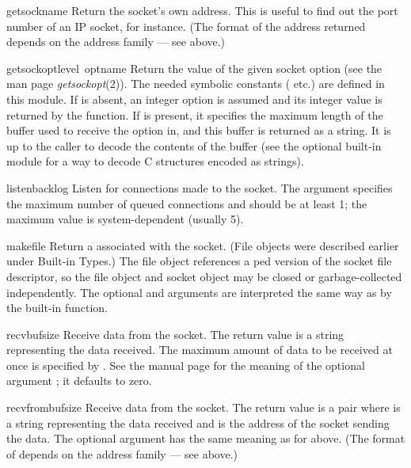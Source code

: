 \begin{funcdesc}{getsockname}{}
Return the socket's own address.  This is useful to find out the port
number of an IP socket, for instance.
(The format of the address returned depends on the address family ---
see above.)
\end{funcdesc}

\begin{funcdesc}{getsockopt}{level\, optname}
Return the value of the given socket option (see the \UNIX{} man page
\emph{getsockopt}(2)).  The needed symbolic constants ( etc.)
are defined in this module.  If 
is absent, an integer option is assumed and its integer value
is returned by the function.  If  is present, it specifies
the maximum length of the buffer used to receive the option in, and
this buffer is returned as a string.  It is up to the caller to decode
the contents of the buffer (see the optional built-in module
 for a way to decode C structures encoded as strings).
\end{funcdesc}

\begin{funcdesc}{listen}{backlog}
Listen for connections made to the socket.  The  argument
specifies the maximum number of queued connections and should be at
least 1; the maximum value is system-dependent (usually 5).
\end{funcdesc}

\begin{funcdesc}{makefile}{}
Return a  associated with the socket.  (File objects
were described earlier under Built-in Types.)  The file object
references a ped version of the socket file descriptor, so
the file object and socket object may be closed or garbage-collected
independently.  The optional  and  arguments
are interpreted the same way as by the built-in
 function.
\end{funcdesc}

\begin{funcdesc}{recv}{bufsize}
Receive data from the socket.  The return value is a string representing
the data received.  The maximum amount of data to be received
at once is specified by .  See the \UNIX{} manual page
for the meaning of the optional argument ; it defaults to
zero.
\end{funcdesc}

\begin{funcdesc}{recvfrom}{bufsize}
Receive data from the socket.  The return value is a pair
 where  is a string
representing the data received and  is the address of the
socket sending the data.  The optional  argument has the
same meaning as for  above.
(The format of  depends on the address family --- see above.)
\end{funcdesc}

